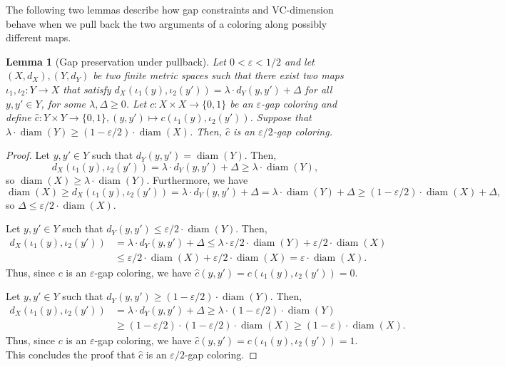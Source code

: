 \documentclass[11pt]{article}
\DeclareMathOperator{\diam}{diam}
\newtheorem{lemma}[theorem]{Lemma}
\theoremstyle{remark}
\begin{document}
The following two lemmas describe how gap constraints and VC-dimension behave when we pull back the two arguments of a coloring along possibly different maps.

\begin{lemma}[Gap preservation under pullback]\label{lem:transfer-gap-coloring}
    Let $0 < \varepsilon < 1/2$ and let $(X, d_X), (Y, d_Y)$ be two finite metric spaces such that there exist two maps $\iota_1, \iota_2 : Y \to X$ that satisfy $d_X(\iota_1(y), \iota_2(y')) = \lambda \cdot d_Y(y, y') + \Delta$ for all $y, y' \in Y$, for some $\lambda, \Delta \geq 0$.
    Let $c : X \times X \to \{0, 1\}$ be an $\varepsilon$-gap coloring and define $\widehat{c} : Y \times Y \to \{0, 1\}, (y, y') \mapsto c(\iota_1(y), \iota_2(y'))$.
    Suppose that $\lambda \cdot \diam(Y) \geq (1-\varepsilon/2) \cdot \diam(X)$.
    Then, $\widehat{c}$ is an $\varepsilon/2$-gap coloring.
\end{lemma}

\begin{proof}
    Let $y, y' \in Y$ such that $d_Y(y, y') = \diam(Y)$.
    Then, \[d_X(\iota_1(y), \iota_2(y')) = \lambda \cdot d_Y(y, y') + \Delta \geq \lambda \cdot \diam(Y),\] so $\diam(X) \geq \lambda \cdot \diam(Y)$.
    Furthermore, we have \[\diam(X) \geq d_X(\iota_1(y), \iota_2(y')) = \lambda \cdot d_Y(y, y') + \Delta = \lambda \cdot \diam(Y) + \Delta \geq (1-\varepsilon/2) \cdot \diam(X) + \Delta,\] so $\Delta \leq \varepsilon/2 \cdot \diam(X)$.

    Let $y, y' \in Y$ such that $d_Y(y, y') \leq \varepsilon/2 \cdot \diam(Y)$.
    Then, \begin{align*}
        d_X(\iota_1(y), \iota_2(y')) &= \lambda \cdot d_Y(y, y') + \Delta \leq \lambda \cdot \varepsilon/2 \cdot \diam(Y) + \varepsilon/2 \cdot \diam(X) \\
        &\leq \varepsilon/2 \cdot \diam(X) + \varepsilon/2 \cdot \diam(X) = \varepsilon \cdot \diam(X).
    \end{align*} Thus, since $c$ is an $\varepsilon$-gap coloring, we have $\widehat{c}(y, y') = c(\iota_1(y), \iota_2(y')) = 0$.
    \smallskip
    
    Let $y, y' \in Y$ such that $d_Y(y, y') \geq (1-\varepsilon/2) \cdot \diam(Y)$.
    Then, \begin{align*}
        d_X(\iota_1(y), \iota_2(y')) &= \lambda \cdot d_Y(y, y') + \Delta \geq \lambda \cdot (1-\varepsilon/2) \cdot \diam(Y) \\
        &\geq (1-\varepsilon/2) \cdot (1-\varepsilon/2) \cdot \diam(X) \geq (1 - \varepsilon) \cdot \diam(X).
    \end{align*} 
    Thus, since $c$ is an $\varepsilon$-gap coloring, we have $\widehat{c}(y, y') = c(\iota_1(y), \iota_2(y')) = 1$.
    This concludes the proof that $\widehat{c}$ is an $\varepsilon/2$-gap coloring.
\end{proof}
\end{document}
